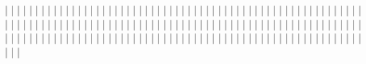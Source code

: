   |                   |                   |
  |                   |                   |
  |                   |                   |
  |                   |                   |
  |                   |                   |
  |                   |                   |
  |                   |                   |
  |                   |                   |
  |                   |                   |
  |                   |                   |
  |                   |                   |
  |                   |                   |
  |                   |                   |
  |                   |                   |
  |                   |                   |
  |                   |                   |
  |                   |                   |
  |                   |                   |
  |                   |                   |
  |                   |                   |
  |                   |                   |
  |                   |                   |
  |                   |                   |
  |                   |                   |
  |                   |                   |
  |                   |                   |
  |                   |                   |
  |                   |                   |
  |                   |                   |
  |                   |                   |
  |                   |                   |
  |                   |                   |
  |                   |                   |
  |                   |                   |
  |                   |                   |
  |                   |                   |
  |                   |                   |
  |                   |                   |
  |                   |                   |
  |                   |                   |
  |                   |                   |
  |                   |                   |
  |                   |                   |
  |                   |                   |
  |                   |                   |
  |                   |                   |
  |                   |                   |
  |                   |                   |
  |                   |                   |
  |                   |                   |
  |                   |                   |
  |                   |                   |
  |                   |                   |
  |                   |                   |
  |                   |                   |
  |                   |                   |
  |                   |                   |
  |                   |                   |
  |                   |                   |
  |                   |                   |
